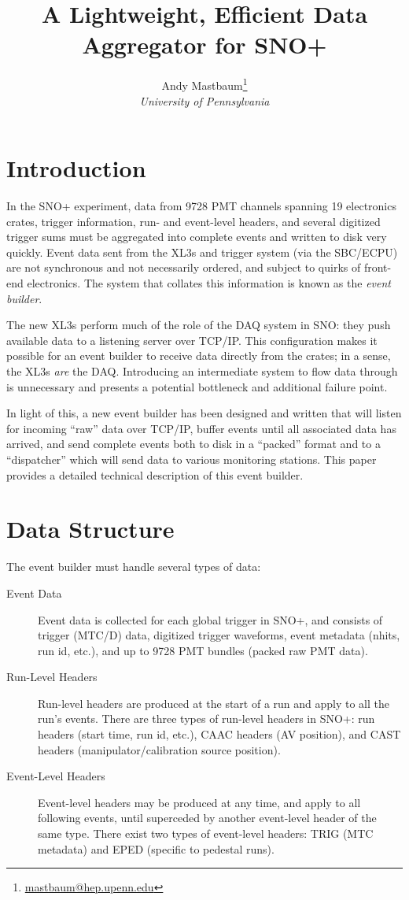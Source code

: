 \documentclass[11pt,twocolumn]{article}
\author{Andy Mastbaum\footnote{\href{mailto:mastbaum@hep.upenn.edu}{mastbaum@hep.upenn.edu}}\\\small{\it University of Pennsylvania}}
\title{A Lightweight, Efficient Data Aggregator for SNO+}
\begin{document}
\maketitle
\section{Introduction}
In the SNO+ experiment, data from 9728 PMT channels spanning 19 electronics crates, trigger information, run- and event-level headers, and several digitized trigger sums must be aggregated into complete events and written to disk very quickly. Event data sent from the XL3s and trigger system (via the SBC/ECPU) are not synchronous and not necessarily ordered, and subject to quirks of front-end electronics. The system that collates this information is known as the {\it event builder}.

The new XL3s perform much of the role of the DAQ system in SNO: they push available data to a listening server over TCP/IP. This configuration makes it possible for an event builder to receive data directly from the crates; in a sense, the XL3s {\it are} the DAQ. Introducing an intermediate system to flow data through is unnecessary and presents a potential bottleneck and additional failure point.

In light of this, a new event builder has been designed and written that will listen for incoming ``raw'' data over TCP/IP, buffer events until all associated data has arrived, and send complete events both to disk in a ``packed'' format and to a ``dispatcher'' which will send data to various monitoring stations. This paper provides a detailed technical description of this event builder.

\section{Data Structure}
The event builder must handle several types of data:
\begin{description}
\item[Event Data] Event data is collected for each global trigger in SNO+, and consists of trigger (MTC/D) data, digitized trigger waveforms, event metadata (nhits, run id, etc.), and up to 9728 PMT bundles (packed raw PMT data).
\item[Run-Level Headers] Run-level headers are produced at the start of a run and apply to all the run's events. There are three types of run-level headers in SNO+: run headers (start time, run id, etc.), CAAC headers (AV position), and CAST headers (manipulator/calibration source position).
\item[Event-Level Headers] Event-level headers may be produced at any time, and apply to all following events, until superceded by another event-level header of the same type. There exist two types of event-level headers: TRIG (MTC metadata) and EPED (specific to pedestal runs).
\end{description}
\end{document}
